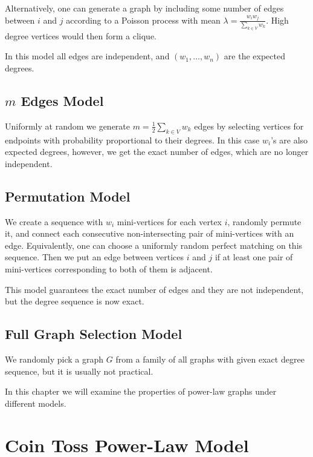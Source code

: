 Alternatively, one can generate a graph by including some number of edges between $i$ and $j$
according to a Poisson process with mean $\lambda=\frac{w_i w_j}{\sum_{k\in V}{w_k}}$.
High degree vertices would then form a clique.

In this model all edges are independent, and $(w_1,\ldots,w_n)$ are the expected degrees.

\subsection{\texorpdfstring{$m$}{m} Edges Model}

Uniformly at random we generate $m=\frac{1}{2}\sum_{k\in V}{w_k}$ edges by
selecting vertices for endpoints with probability proportional to their degrees.
In this case $w_i$'s are also expected degrees, however, we get
the exact number of edges, which are no longer independent.

\subsection{Permutation Model}
\label{subsec:permutation-model}

We create a sequence with $w_i$ mini-vertices for each vertex $i$,
randomly permute it, and connect each consecutive
non-intersecting pair of mini-vertices with an edge.
Equivalently, one can choose a uniformly random perfect matching on this sequence.
Then we put an edge between vertices $i$ and $j$ if at least one pair
of mini-vertices corresponding to both of them is adjacent.

This model guarantees the exact number of edges and they are not independent,
but the degree sequence is now exact.

\subsection{Full Graph Selection Model}

We randomly pick a graph $G$ from a family of all graphs with given
exact degree sequence, but it is usually not practical.

In this chapter we will examine the properties of power-law graphs under different models.

\section{Coin Toss Power-Law Model}
\label{sec:powerlaw-coin-toss-model}

